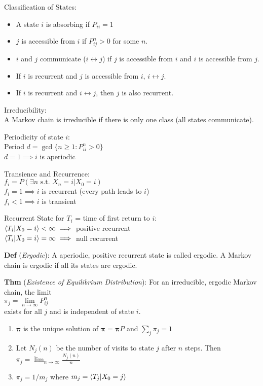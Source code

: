 \documentclass[12pt,landscape]{article}
\newcommand{\tab}{\hspace*{1em}}
\newcommand{\ds}{\displaystyle}
\newcommand{\defn}[1]{\textbf{Def} (\emph{#1})}
\newcommand{\thm}[1]{\textbf{Thm} (\emph{#1})}
\theoremstyle{definition}
\begin{document}
\newpage

\begin{minipage}[t]{0.33\textwidth}
Classification of States:
\begin{itemize}
	\item A state $i$ is absorbing if $P_{ii} = 1$
	\item $j$ is accessible from $i$ if $P_{ij}^n > 0$ for some $n$.
	\item $i$ and $j$ communicate ($i \leftrightarrow j$) if $j$ is accessible from $i$ and $i$ is accessible from $j$.
	\item If $i$ is recurrent and $j$ is accessible from $i$, $i \leftrightarrow j$.
	\item If $i$ is recurrent and $i \leftrightarrow j$, then $j$ is also recurrent.
\end{itemize}

Irreducibility:\\
\tab A Markov chain is irreducible if there is only one class  (all states communicate).

Periodicity of state $i$:\\
\tab Period $d = \gcd\{n \geq 1 : P_{ii}^n > 0\}$\\
\tab $d = 1 \implies i$ is aperiodic

Transience and Recurrence:\\
\tab $f_i = P(\exists n \text{ s.t. } X_n = i | X_0 = i)$\\
\tab $f_i = 1 \implies i$ is recurrent (every path leads to $i$)\\
\tab $f_i < 1 \implies i$ is transient

Recurrent State for $T_i$ = time of first return to $i$:\\
\tab $\expval{T_i | X_0 = i} < \infty \implies$ positive recurrent\\
\tab $\expval{T_i | X_0 = i} = \infty \implies$ null recurrent

\defn{Ergodic}: A aperiodic, positive recurrent state is called ergodic. A Markov chain is ergodic if all its states are ergodic.

\thm{Existence of Equilibrium Distribution}: For an irreducible, ergodic Markov chain, the limit\\
\tab $\pi_j = \lim\limits_{n\rightarrow\infty} P_{ij}^n$\\
exists for all $j$ and is independent of state $i$.
\begin{enumerate}
	\item $\boldsymbol{\pi}$ is the unique solution of $\boldsymbol{\pi} = \boldsymbol{\pi}P$ and $\sum_{j} \pi_j = 1$
	\item Let $N_j(n)$ be the number of visits to state $j$ after $n$ steps. Then $\ds \pi_j = \lim_{n\rightarrow\infty} \frac{N_j(n)}{n}$
	\item $\pi_j = 1/m_j$ where $m_j = \expval{T_j | X_0 = j}$
\end{enumerate}


\end{minipage}
\end{document}
